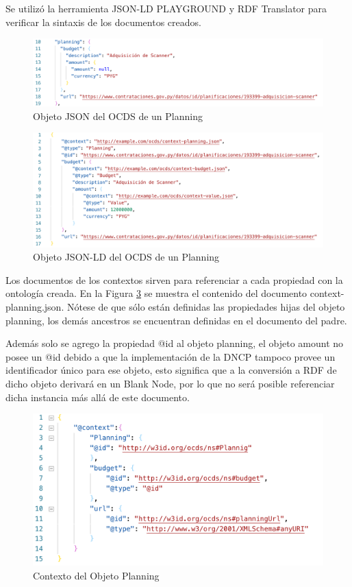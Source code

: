 Se utilizó la herramienta JSON-LD PLAYGROUND \cite{JSONLDPl78:online} y RDF Translator \cite{RDFTrans0:online} para verificar la sintaxis de los documentos creados.

\begin{figure}[h!]
    \centering
    \includegraphics[width=150mm]{figuras/2}
    \caption{Objeto JSON del OCDS de un Planning}
    \label{img:json2}
    \end{figure}

\begin{figure}[h!]
    \centering
    \includegraphics[width=150mm]{figuras/3}
    \caption{Objeto JSON-LD del OCDS de un Planning}
    \label{img:json3}
    \end{figure}


Los documentos de los contextos sirven para referenciar a cada propiedad con la ontología creada. En la Figura \ref{img:json4} se muestra el contenido del documento context-planning.json. Nótese de que sólo están definidas las propiedades hijas del objeto planning, los demás ancestros se encuentran definidas en el documento del padre.

Además solo se agrego la propiedad @id al objeto planning, el objeto amount no posee un @id debido a que la implementación de la DNCP tampoco provee un identificador único para ese objeto, esto significa que a la conversión a RDF de dicho objeto derivará en un Blank Node, por lo que no será posible referenciar dicha instancia más allá de este documento.


\begin{figure}[h!]
    \centering
    \includegraphics[width=150mm]{figuras/4}
    \caption{Contexto del Objeto Planning }
    \label{img:json4}
    \end{figure}


